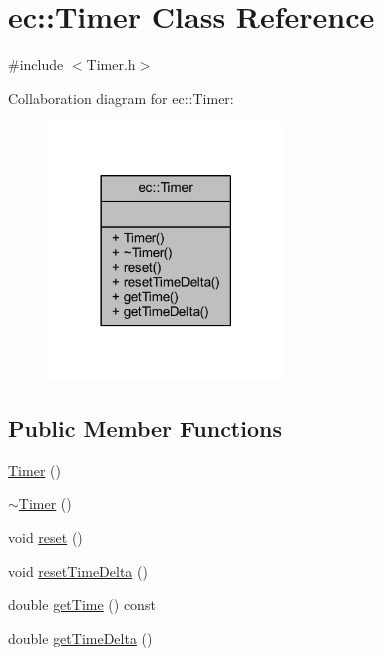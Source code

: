 \hypertarget{classec_1_1_timer}{}\section{ec\+:\+:Timer Class Reference}
\label{classec_1_1_timer}


{\ttfamily \#include $<$Timer.\+h$>$}



Collaboration diagram for ec\+:\+:Timer\+:\nopagebreak
\begin{figure}[H]
\begin{center}
\leavevmode
\includegraphics[width=177pt]{classec_1_1_timer__coll__graph}
\end{center}
\end{figure}
\subsection*{Public Member Functions}
\begin{DoxyCompactItemize}
\item 
\mbox{\hyperlink{classec_1_1_timer_afa10f411221610c507291183b6b6aa56}{Timer}} ()
\item 
\mbox{\hyperlink{classec_1_1_timer_a496dc6127f9d0c8ec3dc8d91de6b6448}{$\sim$\+Timer}} ()
\item 
void \mbox{\hyperlink{classec_1_1_timer_a0f712ea9fa17c4657a877b9322219aa3}{reset}} ()
\item 
void \mbox{\hyperlink{classec_1_1_timer_a9c0d47620b70d0d7f392a9837601dad3}{reset\+Time\+Delta}} ()
\item 
double \mbox{\hyperlink{classec_1_1_timer_a70c1b163f49e71696a632f2d43bec957}{get\+Time}} () const
\item 
double \mbox{\hyperlink{classec_1_1_timer_a17b6b8d3cf83bb86df9164160b791016}{get\+Time\+Delta}} ()
\end{DoxyCompactItemize}


